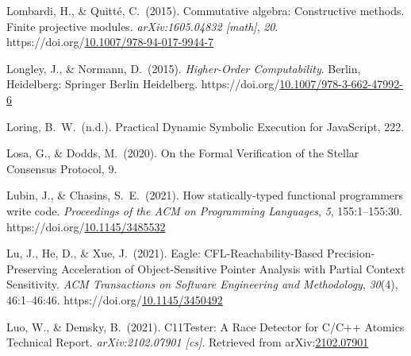 \documentclass[12pt,twoside]{article}
\begin{document}
{\begin{thebibliography}{1079}
\mdbibitemlabel{}Lombardi, H., \& Quitté, C.~(2015). Commutative algebra: Constructive methods. Finite projective modules. \emph{arXiv:1605.04832 {}[math]}, \emph{20}. https://doi.org/\href{https://dx.doi.org/10.1007/978-94-017-9944-7}{10.1007/978-94-017-9944-7}%

\mdbibitemlabel{}Longley, J., \& Normann, D.~(2015). \emph{Higher-Order Computability}. Berlin, Heidelberg: Springer Berlin Heidelberg. https://doi.org/\href{https://dx.doi.org/10.1007/978-3-662-47992-6}{10.1007/978-3-662-47992-6}%

\mdbibitemlabel{}Loring, B.~W.~(n.d.). Practical Dynamic Symbolic Execution for JavaScript, 222.%

\mdbibitemlabel{}Losa, G., \& Dodds, M.~(2020). On the Formal Verification of the Stellar Consensus Protocol, 9.%

\mdbibitemlabel{}Lubin, J., \& Chasins, S.~E.~(2021). How statically-typed functional programmers write code. \emph{Proceedings of the ACM on Programming Languages}, \emph{5}, 155:1–155:30. https://doi.org/\href{https://dx.doi.org/10.1145/3485532}{10.1145/3485532}%

\mdbibitemlabel{}Lu, J., He, D., \& Xue, J.~(2021). Eagle: CFL-Reachability-Based Precision-Preserving Acceleration of Object-Sensitive Pointer Analysis with Partial Context Sensitivity. \emph{ACM Transactions on Software Engineering and Methodology}, \emph{30}(4), 46:1–46:46. https://doi.org/\href{https://dx.doi.org/10.1145/3450492}{10.1145/3450492}%

\mdbibitemlabel{}Luo, W., \& Demsky, B.~(2021). C11Tester: A Race Detector for C/C++ Atomics Technical Report. \emph{arXiv:2102.07901 {}[cs]}. Retrieved from arXiv:\href{http://arxiv.org/abs/2102.07901}{2102.07901}%


\end{thebibliography}}
\end{document}
